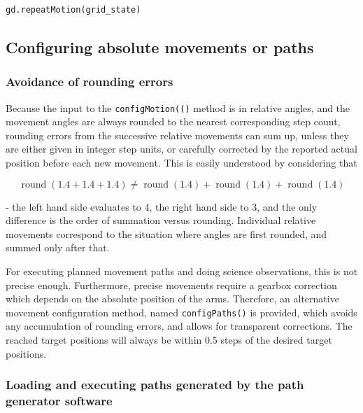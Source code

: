 \documentclass[11pt,a4paper]{scrartcl}
\DeclareMathOperator{\round}{round}
\begin{document}
\begin{verbatim}
gd.repeatMotion(grid_state)
\end{verbatim}


\subsection{Configuring absolute movements or paths}
\label{sec:configuringmovementpaths}

\subsubsection{Avoidance of rounding errors}
%
%
%
%
%
Because the input to the \texttt{configMotion(()} method is in
relative angles, and the movement angles are always rounded to the
nearest corresponding step count, rounding errors from the successive
relative movements can sum up, unless they are either given in integer
step units, or carefully corrected by the reported actual position
before each new movement. This is easily understood by considering that

\[
\round(1.4 + 1.4 + 1.4)\neq \round(1.4) + \round(1.4) + \round(1.4) 
\]

- the left hand side evaluates to 4, the right hand side to 3, and the
only difference is the order of summation versus rounding. Individual
relative movements correspond to the situation where angles are first
rounded, and summed only after that.

For executing planned movement paths and doing science observations,
this is not precise enough. Furthermore, precise movements require a
gearbox correction which depends on the absolute position of the arms.
Therefore, an alternative movement configuration method, named
\texttt{configPaths()} is provided, which avoids any accumulation of
rounding errors, and allows for transparent corrections. The reached
target positions will always be within 0.5 steps of the desired target
positions.


\subsubsection{Loading and executing paths generated by the path generator software}
\label{sec:loadingpaths}
%
%
%
%
%
%
%
%
%
%
\end{document}
